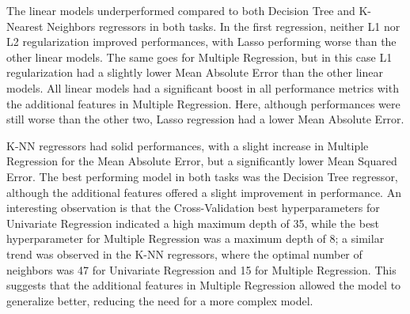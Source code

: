 The linear models underperformed compared to both Decision
Tree and K-Nearest Neighbors regressors in both tasks. In the first regression, neither L1 nor L2
regularization improved performances, with Lasso performing worse than the other linear models.
The same goes for Multiple Regression, but in this case L1 regularization had a slightly lower Mean Absolute Error
than the other linear models.
All linear models had a significant boost in all performance metrics with the additional features in Multiple Regression.
Here, although performances were still worse than the other two, Lasso regression had a lower Mean Absolute Error.

K-NN regressors had solid performances, with a slight increase in Multiple Regression for the Mean Absolute Error,
but a significantly lower Mean Squared Error.
The best performing model in both tasks was the Decision Tree regressor, although the additional features
offered a slight improvement in performance. An interesting observation is that the Cross-Validation
best hyperparameters for Univariate Regression indicated a high maximum depth of 35,
while the best hyperparameter for Multiple Regression was a maximum depth of 8; a similar trend was observed
in the K-NN regressors, where the optimal number of neighbors was 47 for Univariate Regression and 15 for Multiple Regression.
This suggests that the additional features in Multiple Regression allowed the model to generalize better,
reducing the need for a more complex model.



